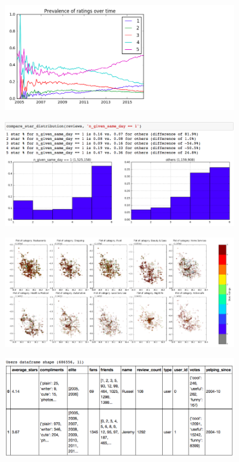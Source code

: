 \documentclass[11pt]{article}
\begin{document}
\begin{figure}[!htb]
\centering
\includegraphics[width=0.9\textwidth]{./ac209/prevalenceofratingsovertime.png}
\end{figure}

\begin{figure}[!htb]
\centering
\includegraphics[width=0.9\textwidth]{./ac209/numstarsreviewsperday.png}
\end{figure}

\begin{figure}[!htb]
\centering
\includegraphics[width=0.9\textwidth]{./ac209/phxstarsbycategorylocation.png}
\end{figure}

\begin{figure}[!htb]
\centering
\includegraphics[width=0.9\textwidth]{./ac209/userdataframe.png}
\end{figure}
\end{document}
